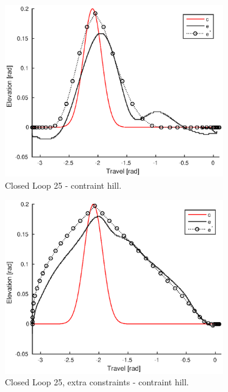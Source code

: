 \begin{figure}[hp]
	\centering
		\includegraphics[width=0.85\textwidth]{figures/4/closedloop25_cons.eps}
	\caption{Closed Loop 25 - contraint hill.}
	\label{fig:closedloop25_cons}
\end{figure}

\begin{figure}[hp]
	\centering
		\includegraphics[width=0.85\textwidth]{figures/4/closedloopConstrained25_cons.eps}
	\caption{Closed Loop 25, extra constraints - contraint hill.}
	\label{fig:closedloopConstrained25_cons}
\end{figure}

